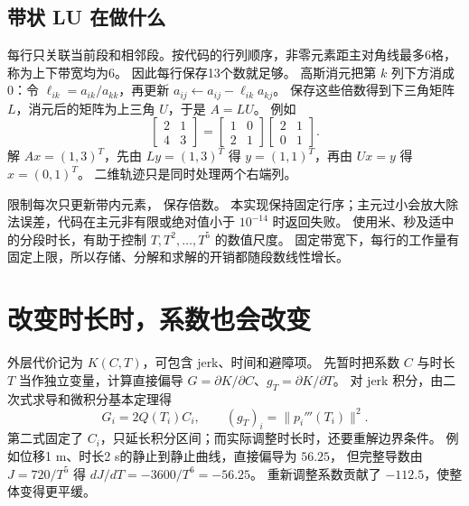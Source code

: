 \subsection{带状 LU 在做什么}
每行只关联当前段和相邻段。按代码的行列顺序，非零元素距主对角线最多6格，称为上下带宽均为6。
因此每行保存13个数就足够。
高斯消元把第 $k$ 列下方消成0：令 $\ell_{ik}=a_{ik}/a_{kk}$，再更新
$a_{ij}\leftarrow a_{ij}-\ell_{ik}a_{kj}$。
保存这些倍数得到下三角矩阵 $L$，消元后的矩阵为上三角 $U$，于是 $A=LU$。
例如
\[
 \begin{bmatrix}2&1\\4&3\end{bmatrix}
 =\begin{bmatrix}1&0\\2&1\end{bmatrix}
  \begin{bmatrix}2&1\\0&1\end{bmatrix}.
\]
解 $Ax=(1,3)^T$，先由 $Ly=(1,3)^T$ 得 $y=(1,1)^T$，再由 $Ux=y$ 得 $x=(0,1)^T$。
二维轨迹只是同时处理两个右端列。
\par\noindent
\begin{minipage}{\linewidth}

\end{minipage}
\par
{} 限制每次只更新带内元素， 保存倍数。
本实现保持固定行序；主元过小会放大除法误差，代码在主元非有限或绝对值小于 $10^{-14}$ 时返回失败。
使用米、秒及适中的分段时长，有助于控制 $T,T^2,\ldots,T^5$ 的数值尺度。
固定带宽下，每行的工作量有固定上限，所以存储、分解和求解的开销都随段数线性增长。

\section{改变时长时，系数也会改变}
外层代价记为 $K(C,T)$，可包含 jerk、时间和避障项。
先暂时把系数 $C$ 与时长 $T$ 当作独立变量，计算直接偏导
$G=\partial K/\partial C$、$g_T=\partial K/\partial T$。
对 jerk 积分，由二次式求导和微积分基本定理得
\begin{equation}
 G_i=2Q(T_i)C_i,\qquad (g_T)_i=\|p_i'''(T_i)\|^2.
\end{equation}
第二式固定了 $C_i$，只延长积分区间；而实际调整时长时，还要重解边界条件。
例如位移1 m、时长2 s的静止到静止曲线，直接偏导为 $56.25$，
但完整导数由 $J=720/T^5$ 得 $dJ/dT=-3600/T^6=-56.25$。
重新调整系数贡献了 $-112.5$，使整体变得更平缓。

